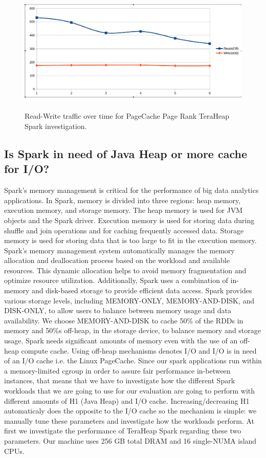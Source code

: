 \begin{figure}[ht]
    \includegraphics[width=12cm,height=6cm]{./fig/rw_pr_pc_th.png}
    \caption{Read-Write traffic over time for PageCache Page Rank
    TeraHeap Spark investigation.}
    \label{fig:rw_pr_pc_th}
\end{figure}
\fi

\subsection{Is Spark in need of Java Heap or more cache for I/O?}

Spark's memory management is critical for the performance of big data
analytics applications. In Spark, memory is divided into three
regions: heap memory, execution memory, and storage memory. The heap
memory is used for JVM objects and the Spark driver. Execution memory
is used for storing data during shuffle and join operations and for
caching frequently accessed data. Storage memory is used for storing
data that is too large to fit in the execution memory. Spark's memory
management system automatically manages the memory allocation and
deallocation process based on the workload and available resources.
This dynamic allocation helps to avoid memory fragmentation and
optimize resource utilization. Additionally, Spark uses a combination
of in-memory and disk-based storage to provide efficient data access.
Spark provides various storage levels, including MEMORY-ONLY,
MEMORY-AND-DISK, and DISK-ONLY, to allow users to balance between
memory usage and data availability. We choose MEMORY-AND-DISK to cache
50\% of the RDDs in memory and 50\%s off-heap, in the storage device,
to balance memory and storage usage. Spark needs significant amounts
of memory even with the use of an off-heap compute cache. Using
off-heap mechanisms denotes I/O and I/O is in need of an I/O cache
i.e. the Linux PageCache. Since our spark applications run within a
memory-limited cgroup in order to assure fair performance in-between
instances, that means that we have to investigate how the different
Spark workloads that we are going to use for our evaluation are going
to perform with different amounts of H1 (Java Heap) and I/O cache.
Increasing/decreasing H1 automaticaly does the opposite to the I/O
cache so the mechanism is simple: we manually tune these parameters
and investigate how the workloads perform. At first we investigate the
performance of TeraHeap Spark regarding these two parameters. Our
machine uses 256 GB total DRAM and 16 single-NUMA island CPUs.

